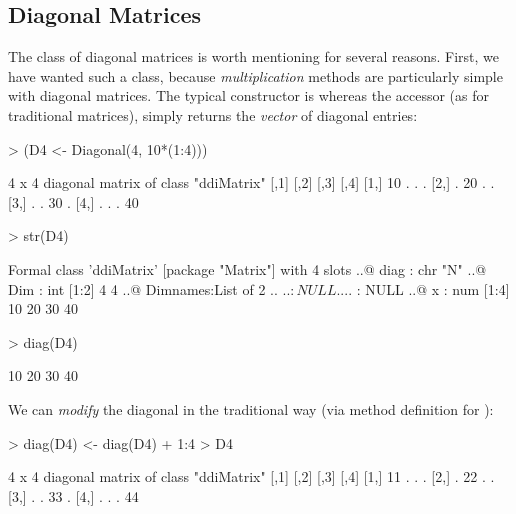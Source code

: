 \documentclass{article}
\begin{document}
\subsection{Diagonal Matrices}
\label{ssec:diagMat}
The class of diagonal matrices is worth mentioning for several reasons.
First, we have wanted such a class, because \emph{multiplication}
methods are particularly simple with diagonal matrices.
The typical constructor is  whereas the accessor
(as for traditional matrices),  simply returns the
\emph{vector} of diagonal entries:
\begin{Schunk}
\begin{Sinput}
> (D4 <- Diagonal(4, 10*(1:4)))
\end{Sinput}
\begin{Soutput}
4 x 4 diagonal matrix of class "ddiMatrix"
     [,1] [,2] [,3] [,4]
[1,]   10    .    .    .
[2,]    .   20    .    .
[3,]    .    .   30    .
[4,]    .    .    .   40
\end{Soutput}
\begin{Sinput}
> str(D4)
\end{Sinput}
\begin{Soutput}
Formal class 'ddiMatrix' [package "Matrix"] with 4 slots
  ..@ diag    : chr "N"
  ..@ Dim     : int [1:2] 4 4
  ..@ Dimnames:List of 2
  .. ..$ : NULL
  .. ..$ : NULL
  ..@ x       : num [1:4] 10 20 30 40
\end{Soutput}
\begin{Sinput}
> diag(D4)
\end{Sinput}
\begin{Soutput}
[1] 10 20 30 40
\end{Soutput}
\end{Schunk}
We can \emph{modify} the diagonal in the traditional way
(via method definition for ):
\begin{Schunk}
\begin{Sinput}
> diag(D4) <- diag(D4) + 1:4
> D4
\end{Sinput}
\begin{Soutput}
4 x 4 diagonal matrix of class "ddiMatrix"
     [,1] [,2] [,3] [,4]
[1,]   11    .    .    .
[2,]    .   22    .    .
[3,]    .    .   33    .
[4,]    .    .    .   44
\end{Soutput}
\end{Schunk}
\end{document}
